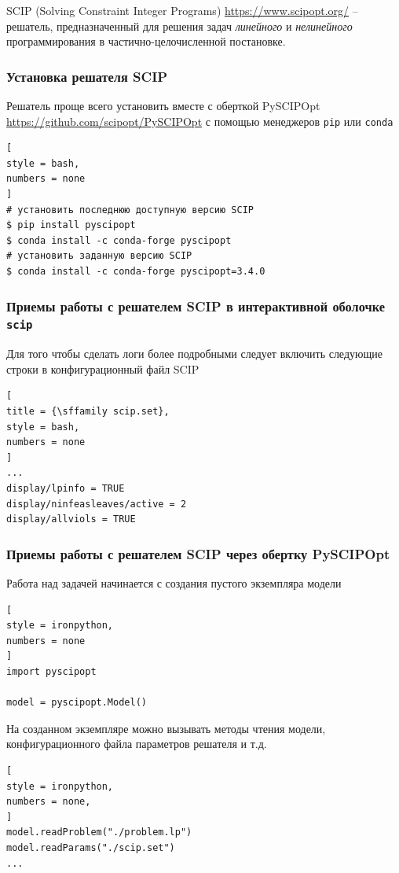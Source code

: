 \documentclass[%
	11pt,
	a4paper,
	utf8,
		]{article}
\begin{document}
SCIP (Solving Constraint Integer Programs) \url{https://www.scipopt.org/} -- решатель, предназначенный для решения задач \emph{линейного} и \emph{нелинейного} программирования в частично-целочисленной постановке.

\subsubsection{Установка решателя SCIP}
Решатель проще всего установить вместе с оберткой PySCIPOpt \url{https://github.com/scipopt/PySCIPOpt} с помощью менеджеров \texttt{pip} или \texttt{conda}
\begin{lstlisting}[
style = bash,
numbers = none
]
# установить последнюю доступную версию SCIP
$ pip install pyscipopt
$ conda install -c conda-forge pyscipopt
# установить заданную версию SCIP
$ conda install -c conda-forge pyscipopt=3.4.0
\end{lstlisting}

\subsubsection{Приемы работы с решателем SCIP в интерактивной оболочке \texttt{scip}}

Для того чтобы сделать логи более подробными следует включить следующие строки в конфигурационный файл SCIP
\begin{lstlisting}[
title = {\sffamily scip.set},
style = bash,
numbers = none
]
...
display/lpinfo = TRUE
display/ninfeasleaves/active = 2
display/allviols = TRUE
\end{lstlisting}

\subsubsection{Приемы работы с решателем SCIP через обертку PySCIPOpt}

Работа над задачей начинается с создания пустого экземпляра модели
\begin{lstlisting}[
style = ironpython,
numbers = none
]
import pyscipopt

model = pyscipopt.Model()
\end{lstlisting}

На созданном экземпляре можно вызывать методы чтения модели, конфигурационного файла параметров решателя и т.д.
\begin{lstlisting}[
style = ironpython,
numbers = none,
]
model.readProblem("./problem.lp")
model.readParams("./scip.set")
...
\end{lstlisting}
\end{document}
